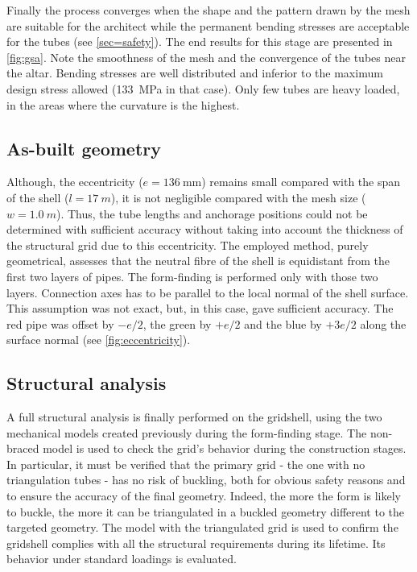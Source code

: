Finally the process converges when the shape and the pattern drawn by the mesh are suitable for the architect while the permanent bending stresses are acceptable for the tubes (see \cref{sec=safety}). The end results for this stage are presented in \cref{fig:gsa}. Note the smoothness of the mesh and the convergence of the tubes near the altar. Bending stresses are well distributed and inferior to the maximum design stress allowed (\SI{133}{MPa} in that case). Only few tubes are heavy loaded, in the areas where the curvature is the highest.

\subsection{As-built geometry}\label{sec=asbuilt}
Although, the eccentricity ($e = \SI{136}{\mm}$) remains small compared with the span of the shell ($l =\SI{17}{m}$), it is not negligible compared with the mesh size ($w = \SI{1.0}{m}$). Thus, the tube lengths and anchorage positions could not be determined with sufficient accuracy without taking into account the thickness of the structural grid due to this eccentricity. The employed method, purely geometrical, assesses that the neutral fibre of the shell is equidistant from the first two layers of pipes. The form-finding is performed only with those two layers. Connection axes has to be parallel to the local normal of the shell surface. This assumption was not exact, but, in this case, gave sufficient accuracy. The red pipe was offset by $-e/2$, the green by $+e/2$ and the blue by $+3e/2$ along the surface normal (see \cref{fig:eccentricity}).


\subsection{Structural analysis}
A full structural analysis is finally performed on the gridshell, using the two mechanical models created previously during the form-finding stage.
The non-braced model is used to check the grid’s behavior during the construction stages. In particular, it must be verified that the primary grid - the one with no triangulation tubes - has no risk of buckling, both for obvious safety reasons and to ensure the accuracy of the final geometry. Indeed, the more the form is likely to buckle, the more it can be triangulated in a buckled geometry different to the targeted geometry. The model with the triangulated grid is used to confirm the gridshell complies with all the structural requirements during its lifetime. Its behavior under standard loadings is evaluated.

